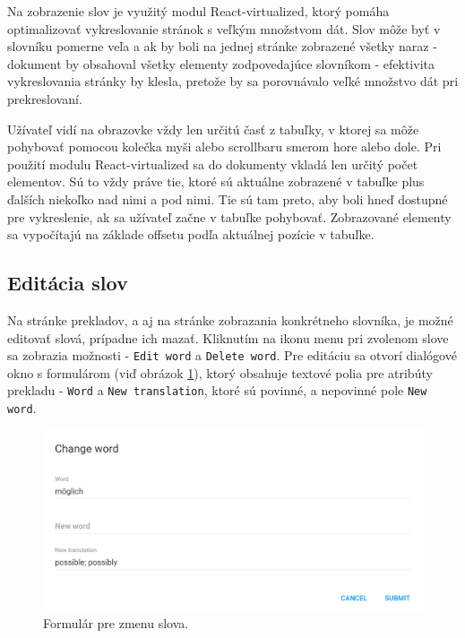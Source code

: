 \documentclass[
  digital, %
  table,   %
  lof,     %
  lot,     %
]{fithesis3}
\begin{document}
Na zobrazenie slov je využitý modul React-virtualized, ktorý pomáha optimalizovať vykreslovanie stránok s veľkým množstvom dát. Slov môže byť v slovníku pomerne veľa a ak by boli na jednej stránke zobrazené všetky naraz - dokument by obsahoval všetky elementy zodpovedajúce slovníkom - efektivita vykreslovania stránky by klesla, pretože by sa porovnávalo veľké množstvo dát pri prekreslovaní.

Užívateľ vidí na obrazovke vždy len určitú časť z tabuľky, v ktorej sa môže pohybovať pomocou kolečka myši alebo scrollbaru smerom hore alebo dole. Pri použití modulu React-virtualized sa do dokumenty vkladá len určitý počet elementov. Sú to vždy práve tie, ktoré sú aktuálne zobrazené v tabuľke plus ďalších niekoľko nad nimi a pod nimi. Tie sú tam preto, aby boli hneď dostupné pre vykreslenie, ak sa užívateľ začne v tabuľke pohybovať. Zobrazované elementy sa vypočítajú na základe offsetu podľa aktuálnej pozície v tabuľke.

\subsection{Editácia slov}
Na stránke prekladov, a aj na stránke zobrazania konkrétneho slovníka, je možné editovať slová, prípadne ich mazať. Kliknutím na ikonu menu pri zvolenom slove sa zobrazia možnosti - \texttt{Edit word} a \texttt{Delete word}. Pre editáciu sa otvorí dialógové okno s formulárom (viď obrázok \ref{fig:changeword-form}), ktorý obsahuje textové polia pre atribúty prekladu - \texttt{Word} a \texttt{New translation}, ktoré sú povinné, a nepovinné pole \texttt{New word}.

\begin{figure}
	\begin{center}
	\includegraphics[width=1.0\textwidth]{img/changeword-form.png}
	\end{center}
    \caption{Formulár pre zmenu slova.}
	\label{fig:changeword-form}
\end{figure}
\end{document}
